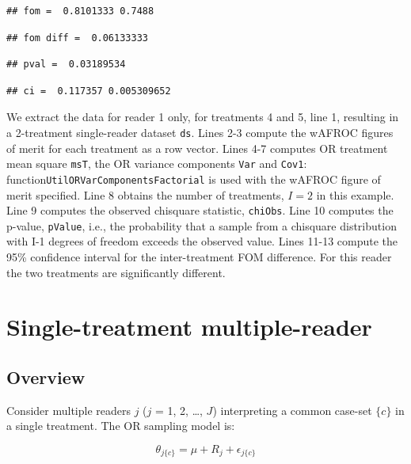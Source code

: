 \documentclass[
]{book}
\begin{document}
\begin{verbatim}
## fom =  0.8101333 0.7488
\end{verbatim}

\begin{verbatim}
## fom diff =  0.06133333
\end{verbatim}

\begin{verbatim}
## pval =  0.03189534
\end{verbatim}

\begin{verbatim}
## ci =  0.117357 0.005309652
\end{verbatim}

We extract the data for reader 1 only, for treatments 4 and 5, line 1, resulting in a 2-treatment single-reader dataset \texttt{ds}. Lines 2-3 compute the wAFROC figures of merit for each treatment as a row vector. Lines 4-7 computes OR treatment mean square \texttt{msT}, the OR variance components \texttt{Var} and \texttt{Cov1}: function\texttt{UtilORVarComponentsFactorial} is used with the wAFROC figure of merit specified. Line 8 obtains the number of treatments, \(I=2\) in this example. Line 9 computes the observed chisquare statistic, \texttt{chiObs}. Line 10 computes the p-value, \texttt{pValue}, i.e., the probability that a sample from a chisquare distribution with I-1 degrees of freedom exceeds the observed value. Lines 11-13 compute the 95\% confidence interval for the inter-treatment FOM difference. For this reader the two treatments are significantly different.

\hypertarget{or-method-intro-single-treatment}{%
\section{Single-treatment multiple-reader}\label{or-method-intro-single-treatment}}

\hypertarget{or-method-intro-single-treatment-overview}{%
\subsection{Overview}\label{or-method-intro-single-treatment-overview}}

Consider multiple readers \(j\) (\(j\) = 1, 2, \ldots, \(J\)) interpreting a common case-set \(\{c\}\) in a single treatment. The OR sampling model is:

\begin{equation}
\theta_{j\{c\}}=\mu+R_j+\epsilon_{j\{c\}}
\label{eq:or-sampling-model-multiple-reader}
\end{equation}
\end{document}
